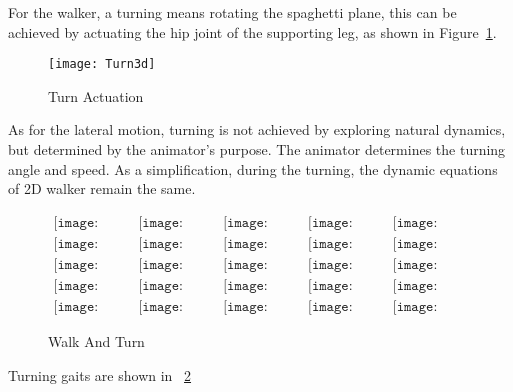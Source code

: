 For the walker,  a turning means rotating the spaghetti plane, this can be achieved by actuating the  hip joint of the supporting leg, as shown in Figure~\ref{fig:turn}.


\begin{figure}[!htbp]
  \begin{center}
      \texttt{[image: Turn3d]}
    \caption{Turn Actuation}
    \label{fig:turn}
\end{center}
\end{figure}


As for the lateral motion, turning is not achieved by exploring  natural dynamics, but determined by the animator's purpose.
The animator determines the turning angle and speed.
As a simplification, during the turning, the dynamic equations of 2D walker remain the same.





\begin{figure}[!htbp]
  \begin{center}
  $
     \begin{array}{ccccc}
\texttt{[image: turn/0001.eps]}&
\texttt{[image: turn/0201.eps]}&
\texttt{[image: turn/0301.eps]}&
\texttt{[image: turn/0401.eps]}&
\texttt{[image: turn/0501.eps]}
\\
\texttt{[image: turn/0601.eps]}&
\texttt{[image: turn/0701.eps]}&
\texttt{[image: turn/0801.eps]}&
\texttt{[image: turn/0901.eps]}&
\texttt{[image: turn/1001.eps]}
\\
\texttt{[image: turn/1101.eps]}&
\texttt{[image: turn/1201.eps]}&
\texttt{[image: turn/1301.eps]}&
\texttt{[image: turn/1401.eps]}&
\texttt{[image: turn/1501.eps]}
\\
\texttt{[image: turn/1601.eps]}&
\texttt{[image: turn/1701.eps]}&
\texttt{[image: turn/1801.eps]}&
\texttt{[image: turn/1901.eps]}&
\texttt{[image: turn/2001.eps]}
\\
\texttt{[image: turn/2101.eps]}&
\texttt{[image: turn/2201.eps]}&
\texttt{[image: turn/2301.eps]}&
\texttt{[image: turn/2401.eps]}&
\texttt{[image: turn/2501.eps]}

\end{array}$
    \caption{Walk And Turn}
    \label{fig:walkturn}
\end{center}
\end{figure}
Turning gaits are shown in ~\ref{fig:walkturn}




